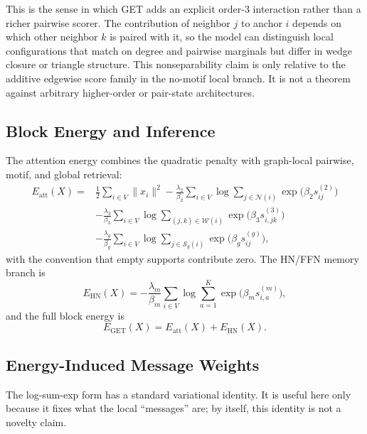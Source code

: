 \documentclass[11pt,a4paper]{article}
\begin{document}
This is the sense in which GET adds an explicit order-3 interaction rather
than a richer pairwise scorer. The contribution of neighbor $j$ to anchor $i$
depends on which other neighbor $k$ is paired with it, so the model can
distinguish local configurations that match on degree and pairwise marginals
but differ in wedge closure or triangle structure.
This nonseparability claim is only relative to the additive edgewise score
family in the no-motif local branch. It is not a theorem against arbitrary
higher-order or pair-state architectures.

\subsection{Block Energy and Inference}

The attention energy combines the quadratic penalty with graph-local pairwise,
motif, and global retrieval:
\begin{equation}
\begin{aligned}
  E_{\mathrm{att}}(X)
  ={}& \frac{1}{2}\sum_{i\in V}\|x_i\|^2
     - \frac{\lambda_2}{\beta_2}\sum_{i\in V}
       \log\sum_{j\in\mathcal{N}(i)} \exp\!\bigl(\beta_2 s^{(2)}_{ij}\bigr) \\
    &- \frac{\lambda_3}{\beta_3}\sum_{i\in V}
       \log\sum_{(j,k)\in\mathcal{W}(i)}
         \exp\!\bigl(\beta_3 s^{(3)}_{i,jk}\bigr)\\
    &- \frac{\lambda_g}{\beta_g}\sum_{i\in V}
       \log\sum_{j\in\mathcal S_g(i)}
         \exp\!\bigl(\beta_g s^{(g)}_{ij}\bigr),
\end{aligned}
  \label{eq:eatt}
\end{equation}
with the convention that empty supports contribute zero. The HN/FFN memory
branch is
\begin{equation}
  E_{\mathrm{HN}}(X)
  = -\frac{\lambda_m}{\beta_m}\sum_{i\in V}
      \log\sum_{a=1}^{K}\exp\!\bigl(\beta_m s^{(m)}_{i,a}\bigr),
  \label{eq:ehn}
\end{equation}
and the full block energy is
\begin{equation}
  E_{\mathrm{GET}}(X) = E_{\mathrm{att}}(X) + E_{\mathrm{HN}}(X).
  \label{eq:fullenergy}
\end{equation}

\subsection{Energy-Induced Message Weights}

The log-sum-exp form has a standard variational identity. It is useful here
only because it fixes what the local ``messages'' are; by itself, this identity
is not a novelty claim.
\end{document}

